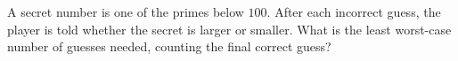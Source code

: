 A secret number is one of the primes below $100$. After each incorrect guess, the player is told whether the secret is larger or smaller. What is the least worst-case number of guesses needed, counting the final correct guess?
